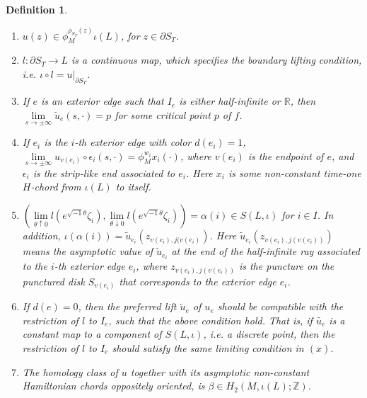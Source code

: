 \documentclass{amsart}
\newtheorem{definition}[theorem]{Definition}
\numberwithin{equation}{section}
\numberwithin{figure}{section}
\begin{document}
\begin{definition}
\begin{enumerate}[label = (\roman*)]
\item $u(z) \in \phi_{M}^{\rho_{S_{T}}(z)} \iota(L)$, for $z \in \partial S_{T}$.

\item $l: \partial S_{T} \to L$ is a continuous map, which specifies the boundary lifting condition, i.e. $\iota \circ l = u|_{\partial S_{T}}$.

\item If $e$ is an exterior edge such that $I_{e}$ is either half-infinite or $\mathbb{R}$, then $\lim\limits_{s \to \pm \infty} \tilde{u}_{e}(s, \cdot) = p$ for some critical point $p$ of $f$.

\item If $e_{i}$ is the $i$-th exterior edge with color $d(e_{i}) = 1$, $\lim\limits_{s \to \pm \infty} u_{v(e_{i})} \circ \epsilon_{i}(s, \cdot) = \phi_{M}^{w_{i}}x_{i}(\cdot)$, where $v(e_{i})$ is the endpoint of $e$, and $\epsilon_{i}$ is the strip-like end associated to $e_{i}$. Here $x_{i}$ is some non-constant time-one $H$-chord from $\iota(L)$ to itself.

\item $(\lim\limits_{\theta \uparrow 0} l(e^{\sqrt{-1}\theta}\zeta_{i}), \lim\limits_{\theta \downarrow 0} l(e^{\sqrt{-1}\theta}\zeta_{i})) = \alpha(i) \in S(L, \iota)$ for $i \in I$. In addition, $\iota(\alpha(i)) = \tilde{u}_{e_{i}}(z_{v(e_{i}), j(v(e_{i})})$. Here $\tilde{u}_{e_{i}}(z_{v(e_{i}), j(v(e_{i}))})$ means the asymptotic value of $\tilde{u}_{e_{i}}$ at the end of the half-infinite ray associated to the $i$-th exterior edge $e_{i}$, where $z_{v(e_{i}), j(v(e_{i}))}$ is the puncture on the punctured disk $S_{v(e_{i})}$ that corresponds to the exterior edge $e_{i}$.

\item If $d(e) = 0$, then the preferred lift $\tilde{u}_{e}$ of $u_{e}$ should be compatible with the restriction of $l$ to $I_{e}$, such that the above condition hold. That is, if $\tilde{u_{e}}$ is a constant map to a component of $S(L, \iota)$, i.e. a discrete point, then the restriction of $l$ to $I_{e}$ should satisfy the same limiting condition in $(x)$.

\item The homology class of $u$ together with its asymptotic non-constant Hamiltonian chords oppositely oriented, is $\beta \in H_{2}(M, \iota(L); \mathbb{Z})$.

\end{enumerate}
\end{definition}
\end{document}
